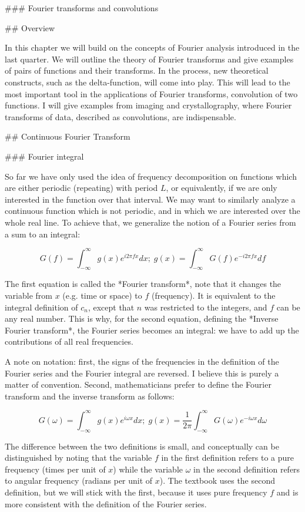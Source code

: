 ### Fourier transforms and convolutions

## Overview

In this chapter we will build on the concepts of Fourier analysis introduced in the last quarter. We will outline the theory of Fourier transforms and give examples of pairs of functions and their transforms. In the process, new theoretical constructs, such as the delta-function, will come into play. This will lead to the most important tool in the applications of Fourier transforms, convolution of two functions. I will give examples from imaging and crystallography, where Fourier transforms of data, described as  convolutions, are indispensable.

## Continuous Fourier Transform

### Fourier integral

So far we have only used the idea of frequency decomposition on functions which are either periodic (repeating) with period $L$, or equivalently, if we are only interested in the function over that interval. We may want to similarly analyze a continuous function which is not periodic, and in which we are interested over the whole real line. To achieve that, we generalize the notion of a Fourier series from a sum to an integral:

$$
G(f) =   \int_{-\infty}^\infty g(x) e^{i2\pi f x}dx; \; g(x) =  \int_{-\infty }^\infty G(f) e^{-i2\pi fx}df
$$

The first equation is called the *Fourier transform*, note that it changes the variable from $x$ (e.g. time or space) to $f$ (frequency). It is equivalent to the integral definition of $c_n$, except that $n$ was restricted to the integers, and $f$ can be any real number. This is why, for the second equation, defining the *Inverse Fourier transform*, the Fourier series becomes an integral: we have to add up the contributions of all real frequencies.

A note on notation: first, the signs of the frequencies in the definition of the Fourier series and the Fourier integral are reversed. I believe this is purely a matter of convention. Second, mathematicians prefer to define the Fourier transform and the inverse transform as follows:

$$
G(\omega) =   \int_{-\infty}^\infty g(x) e^{i \omega x}dx; \; g(x) =  \frac{1}{2\pi} \int_{-\infty }^\infty G(\omega) e^{-i\omega x}d\omega
$$

The difference between the two definitions is small, and conceptually can be distinguished by noting that the variable $f$ in the first definition refers to a pure frequency (times per unit of $x$) while the variable $\omega$ in the second definition refers to angular frequency (radians per unit of $x$). The textbook uses the second definition, but we will stick with the first, because it uses pure frequency $f$ and is more consistent with the definition of the Fourier series.

